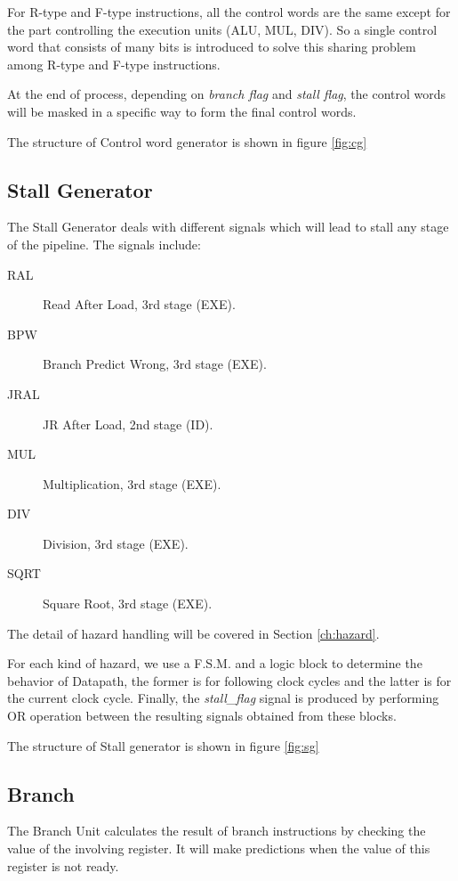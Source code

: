 For R-type and F-type instructions, all the control words are the same
except for the part controlling the execution units (ALU, MUL, DIV).
So a single control word that consists of many bits is introduced to solve this sharing problem among R-type
and F-type instructions.

At the end of process, depending on {\it branch flag} and {\it stall flag}, the control words will be masked in
a specific way to form the final control words.

The structure of Control word generator is shown in figure \ref{fig:cg}

\subsection[Stall Generator]{Stall Generator}
The Stall Generator deals with different signals which will lead to stall any stage
of the pipeline. The signals include:

\begin{description}
  \item[RAL] Read After Load, 3rd stage (EXE).
  \item[BPW] Branch Predict Wrong, 3rd stage (EXE).
  \item[JRAL] JR After Load, 2nd stage (ID).
  \item[MUL] Multiplication, 3rd stage (EXE).
  \item[DIV] Division, 3rd stage (EXE).
  \item[SQRT] Square Root, 3rd stage (EXE).
\end{description}

The detail of hazard handling will be covered in Section \ref{ch:hazard}.

For each kind of hazard, we use a F.S.M. and a logic block to determine the behavior of
Datapath, the former is for following clock cycles and the latter is for the current clock
cycle. Finally, the {\it stall\_flag} signal is produced by performing OR operation between
the resulting signals obtained from these blocks.

The structure of Stall generator is shown in figure \ref{fig:sg}

\subsection[Branch]{Branch}
The Branch Unit calculates the result of branch instructions by checking the value
of the involving register. It will make predictions when the value of this register
is not ready.

